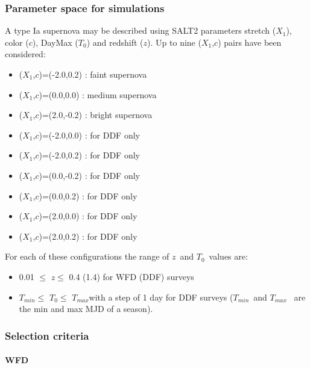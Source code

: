 \documentclass [11pt,a4paper]{article}
\newcommand{\strech}{$X_1$}
\newcommand{\sncolor}{$c$}
\newcommand{\daymax}{$T_0$}
\newcommand{\redshift}{$z$}
\newcommand{\tmin}{$T_{min}$}
\newcommand{\tmax}{$T_{max}$}
\begin{document}
\subsubsection{ Parameter space for simulations}
A type Ia supernova may be described using SALT2 parameters stretch (\strech), color (\sncolor), DayMax (\daymax) and redshift (\redshift). Up to nine (\strech,\sncolor) pairs have been considered:
\begin{itemize}
\item (\strech,\sncolor)=(-2.0,0.2) : faint supernova
\item (\strech,\sncolor)=(0.0,0.0) : medium supernova
\item (\strech,\sncolor)=(2.0,-0.2) : bright supernova
\item (\strech,\sncolor)=(-2.0,0.0) : for DDF only
\item (\strech,\sncolor)=(-2.0,0.2) : for DDF only
\item (\strech,\sncolor)=(0.0,-0.2) : for DDF only
\item (\strech,\sncolor)=(0.0,0.2) : for DDF only
\item (\strech,\sncolor)=(2.0,0.0) : for DDF only
\item (\strech,\sncolor)=(2.0,0.2) : for DDF only
\end{itemize}

For each of these configurations the range of \redshift~and \daymax~values are:
\begin{itemize}
\item 0.01 $\leq$ \redshift $\leq$ 0.4 (1.4) for WFD (DDF) surveys
 \item \tmin  $\leq$ \daymax  $\leq$ \tmax  with a step of 1 day for DDF surveys (\tmin~and \tmax~ are the min and max MJD of a season).
 \end{itemize}
\subsubsection{ Selection criteria}

\paragraph{ WFD}
\end{document}
